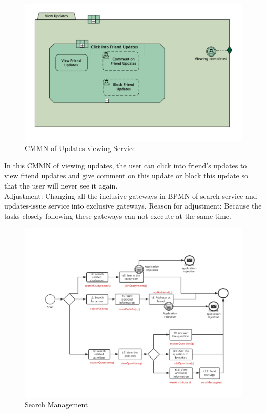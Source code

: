 \documentclass[runningheads]{llncs}
\begin{document}
\begin{figure}[H]
		\centering %
		\includegraphics[width=1.0\textwidth]{./figure/PMZ/cmmn} %
		\caption{CMMN of Updates-viewing Service} %
		\label{cmmn} %
	\end{figure}
In this CMMN of viewing updates, the user can click into friend's updates to view friend updates and give comment on this update or block this update so that the user will never see it again.
\\
Adjustment:
Changing all the inclusive gateways in BPMN of search-service and updates-issue service into exclusive gateways. Reason for adjustment: Because the tasks closely following these gateways can not execute at the same time.
\\
\begin{figure}[H]
		\centering %
		\includegraphics[width=1.0\textwidth]{./figure/PMZ/search} %
		\caption{Search Management} %
		\label{sea} %
	\end{figure}
\end{document}
